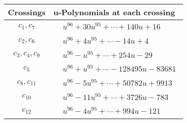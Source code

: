\documentclass[1p]{elsarticle_modified}
\theoremstyle{definition}
\begin{document}
\begin{tabular}{m{50pt}|m{274pt}}
Crossings & \hspace{64pt}u-Polynomials at each crossing \\
\hline $$\begin{aligned}c_{1},c_{7}\end{aligned}$$&$\begin{aligned}
&u^{96}+30 u^{95}+\cdots+140 u+16
\end{aligned}$\\
\hline $$\begin{aligned}c_{2},c_{6}\end{aligned}$$&$\begin{aligned}
&u^{96}+4 u^{95}+\cdots-14 u+4
\end{aligned}$\\
\hline $$\begin{aligned}c_{3},c_{4},c_{9}\end{aligned}$$&$\begin{aligned}
&u^{96}- u^{95}+\cdots+254 u-29
\end{aligned}$\\
\hline $$\begin{aligned}c_{5}\end{aligned}$$&$\begin{aligned}
&u^{96}+u^{95}+\cdots-128495 u-83681
\end{aligned}$\\
\hline $$\begin{aligned}c_{8},c_{11}\end{aligned}$$&$\begin{aligned}
&u^{96}-5 u^{95}+\cdots+50782 u+9913
\end{aligned}$\\
\hline $$\begin{aligned}c_{10}\end{aligned}$$&$\begin{aligned}
&u^{96}-11 u^{95}+\cdots+3726 u-783
\end{aligned}$\\
\hline $$\begin{aligned}c_{12}\end{aligned}$$&$\begin{aligned}
&u^{96}-4 u^{95}+\cdots+994 u-121
\end{aligned}$\\
\hline
\end{tabular}\\~\\
\newpage\renewcommand{\arraystretch}{1}
\end{document}
